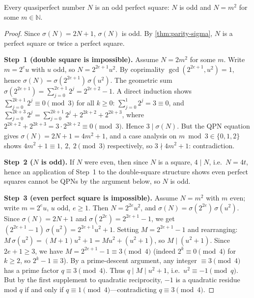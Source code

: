\begin{theorem}\label{thm:qpn-odd-sq}
Every quasiperfect number $N$ is an odd perfect square: $N$ is odd and
$N = m^{2}$ for some $m \in \mathbb{N}$.
\end{theorem}

\begin{proof}
Since $\sigma(N) = 2N+1$, $\sigma(N)$ is odd.  By \cref{thm:parity-sigma}, $N$ is a
perfect square or twice a perfect square.

\textbf{Step~1 (double square is impossible).}
Assume $N = 2m^2$ for some $m$.  Write $m = 2^e u$ with $u$ odd, so
$N = 2^{2e+1}u^2$.  By coprimality $\gcd(2^{2e+1}, u^2)=1$, hence
$\sigma(N) = \sigma(2^{2e+1})\,\sigma(u^2)$.
The geometric sum $\sigma(2^{2e+1}) = \sum_{j=0}^{2e+1} 2^j = 2^{2e+2}-1$.
A direct induction shows $\sum_{j=0}^{2k+1} 2^j \equiv 0 \pmod{3}$ for all $k \ge 0$:
$\sum_{j=0}^{1} 2^j = 3 \equiv 0$, and $\sum_{j=0}^{2k+3} 2^j = \sum_{j=0}^{2k+1} 2^j + 2^{2k+2}+2^{2k+3}$,
where $2^{2k+2}+2^{2k+3} = 3\cdot 2^{2k+2}\equiv 0\pmod3$.  Hence $3 \mid \sigma(N)$.
But the QPN equation gives $\sigma(N) = 2N+1 = 4m^2+1$, and a case analysis
on $m \bmod 3 \in \{0,1,2\}$ shows $4m^2+1 \equiv 1,\ 2,\ 2 \pmod{3}$ respectively,
so $3 \nmid 4m^2+1$: contradiction.

\textbf{Step~2 ($N$ is odd).}
If $N$ were even, then since $N$ is a square, $4 \mid N$, i.e.~$N = 4t$, hence an
application of Step~1 to the double-square structure shows even perfect squares cannot
be QPNs by the argument below, so $N$ is odd.

\textbf{Step~3 (even perfect square is impossible).}
Assume $N = m^2$ with $m$ even; write $m = 2^e u$, $u$ odd, $e \ge 1$.
Then $N = 2^{2e}u^2$, and $\sigma(N) = \sigma(2^{2e})\,\sigma(u^2)$.
Since $\sigma(N)=2N+1$ and $\sigma(2^{2e}) = 2^{2e+1}-1$, we get
$(2^{2e+1}-1)\,\sigma(u^2) = 2^{2e+1}u^2+1$.
Setting $M = 2^{2e+1}-1$ and rearranging:
$M\,\sigma(u^2) = (M+1)u^2+1 = Mu^2 + (u^2+1)$, so $M \mid (u^2+1)$.
Since $2e+1 \ge 3$, we have $M = 2^{2e+1}-1 \equiv 3 \pmod 4$
(indeed $2^k \equiv 0 \pmod 4$ for $k \ge 2$, so $2^k - 1 \equiv 3$).
By a prime-descent argument, any integer $\equiv 3 \pmod 4$ has a prime
factor $q \equiv 3 \pmod 4$.  Thus $q \mid M \mid u^2+1$, i.e.\ $u^2 \equiv -1 \pmod q$.
But by the first supplement to quadratic reciprocity, $-1$ is a quadratic
residue mod $q$ if and only if $q \equiv 1 \pmod 4$---contradicting $q \equiv 3 \pmod 4$.
\end{proof}


